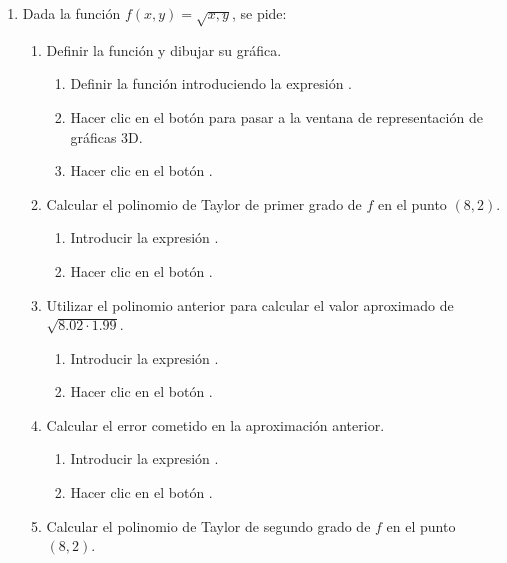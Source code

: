 \begin{enumerate}[leftmargin=*]
\item Dada la función $f(x,y)=\sqrt{x,y}$, se pide:
\begin{enumerate}
\item Definir la función y dibujar su gráfica.
\begin{indicacion}
{\begin{enumerate}
\item Definir la función introduciendo la expresión .
\item Hacer clic en el botón  para pasar a la ventana de representación de gráficas 3D.
\item Hacer clic en el botón .
\end{enumerate}
}
\end{indicacion}
\item Calcular el polinomio de Taylor de primer grado de $f$ en el punto $(8,2)$.
\begin{indicacion}
{\begin{enumerate}
\item Introducir la expresión .
\item Hacer clic en el botón .
\end{enumerate}
}
\end{indicacion}
\item Utilizar el polinomio anterior para calcular el valor aproximado de $\sqrt{8.02\cdot 1.99}$.
\begin{indicacion}
{\begin{enumerate}
\item Introducir la expresión .
\item Hacer clic en el botón .
\end{enumerate}
}
\end{indicacion}
\item Calcular el error cometido en la aproximación anterior.
\begin{indicacion}
{\begin{enumerate}
\item Introducir la expresión .
\item Hacer clic en el botón .
\end{enumerate}
}
\end{indicacion}
\item Calcular el polinomio de Taylor de segundo grado de $f$ en el punto $(8,2)$.
\begin{indicacion}

\end{indicacion}
\end{enumerate}
\end{enumerate}

